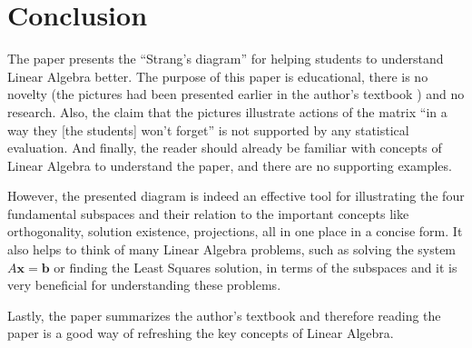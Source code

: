 \documentclass{acm_proc_article-sp}
\begin{document}
\section{Conclusion}

The paper presents the ``Strang's diagram'' for helping students to understand Linear Algebra better. The purpose of this paper is educational, there is no novelty (the pictures had been presented earlier in the author's textbook \cite{strang1988book}) and no research. Also, the claim that the pictures illustrate actions of the matrix ``in a way they [the students] won't forget'' is not supported by any statistical evaluation.
And finally, the reader should already be familiar with concepts of Linear Algebra to understand the paper, and there are no supporting examples.

However, the presented diagram is indeed an effective tool for illustrating the four fundamental
subspaces and their relation to the important concepts like orthogonality, solution existence,
projections, all in one place in a concise form.
It also helps to think of many Linear Algebra problems, such as solving the system $A \mathbf x = \mathbf b$ or finding the Least Squares solution, in terms of the subspaces and it is
very beneficial for understanding these problems.

Lastly, the paper summarizes the author's textbook \cite{strang1988book} and therefore reading
the paper is a good way of refreshing the key concepts of Linear Algebra.






\balancecolumns
\end{document}
